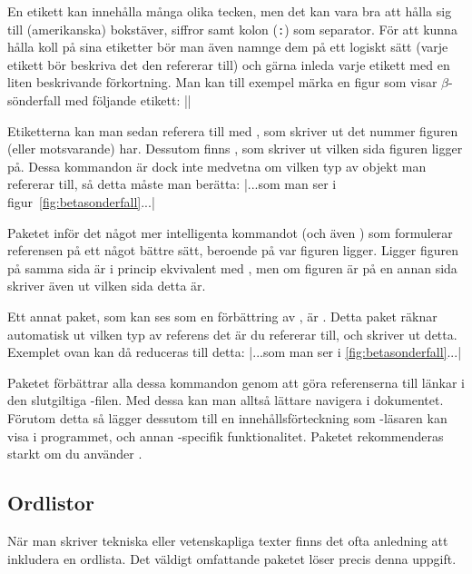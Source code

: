 \documentclass[10pt,../../a4.tex]{subfiles}
\begin{document}
En etikett kan innehålla många olika tecken, men det kan vara bra att
hålla sig till (amerikanska) bokstäver, siffror samt kolon (\texttt{:}) 
som separator.
För att kunna hålla koll på sina etiketter bör man även namnge dem på ett
logiskt sätt (varje etikett bör beskriva det den refererar till) och gärna
inleda varje etikett med en liten beskrivande förkortning. Man kan till
exempel märka en figur som visar \(\beta\)-sönderfall med följande etikett:
\latex|\label{fig:betasonderfall}|

Etiketterna kan man sedan referera till med , som skriver ut det
nummer figuren (eller motsvarande) har. Dessutom finns , som
skriver ut vilken sida figuren ligger på. Dessa kommandon är dock inte
medvetna om vilken typ av objekt man refererar till, så detta måste man
berätta:
\latex|...som man ser i figur~\ref{fig:betasonderfall}...|

Paketet  inför det något mer intelligenta kommandot
 (och även ) som formulerar referensen på ett
något bättre sätt, beroende på var figuren ligger. Ligger figuren på samma
sida är  i princip ekvivalent med , men om figuren är
på en annan sida skriver  även ut vilken sida detta är.

Ett annat paket, som kan ses som en förbättring av , är
. Detta paket räknar automatisk ut vilken typ av referens
det är du refererar till, och skriver ut detta. Exemplet ovan kan då
reduceras till detta:
\latex|...som man ser i \cref{fig:betasonderfall}...|

Paketet  förbättrar alla dessa kommandon genom att
göra referenserna till länkar i den slutgiltiga \PDF-filen. Med dessa kan
man alltså lättare navigera i dokumentet. Förutom detta så lägger
 dessutom till en innehållsförteckning som \PDF-läsaren
kan visa i programmet, och annan \PDF-specifik funktionalitet. Paketet
rekommenderas starkt om du använder \pdfLaTeX.

{\vspace*{-0.75\baselineskip}}%
\subsection{Ordlistor}\label{sec:2:glossaries}
{\vspace*{-0.25\baselineskip}}%
När man skriver tekniska eller vetenskapliga texter finns det ofta
anledning att inkludera en ordlista. Det väldigt omfattande paketet
 löser precis denna uppgift.
\end{document}
